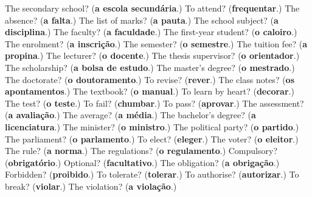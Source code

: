 \begin{tcolorbox}[breakable,colback=teal!4,colframe=teal!35!black,title={Before you move on}]
The secondary school? (\textbf{a escola secundária}.) To attend? (\textbf{frequentar}.) The absence? (\textbf{a falta}.) The list of marks? (\textbf{a pauta}.) The school subject? (\textbf{a disciplina}.) The faculty? (\textbf{a faculdade}.) The first-year student? (\textbf{o caloiro}.) The enrolment? (\textbf{a inscrição}.) The semester? (\textbf{o semestre}.) The tuition fee? (\textbf{a propina}.) The lecturer? (\textbf{o docente}.) The thesis supervisor? (\textbf{o orientador}.) The scholarship? (\textbf{a bolsa de estudo}.) The master's degree? (\textbf{o mestrado}.) The doctorate? (\textbf{o doutoramento}.) To revise? (\textbf{rever}.) The class notes? (\textbf{os apontamentos}.) The textbook? (\textbf{o manual}.) To learn by heart? (\textbf{decorar}.) The test? (\textbf{o teste}.) To fail? (\textbf{chumbar}.) To pass? (\textbf{aprovar}.) The assessment? (\textbf{a avaliação}.) The average? (\textbf{a média}.) The bachelor's degree? (\textbf{a licenciatura}.) The minister? (\textbf{o ministro}.) The political party? (\textbf{o partido}.) The parliament? (\textbf{o parlamento}.) To elect? (\textbf{eleger}.) The voter? (\textbf{o eleitor}.) The rule? (\textbf{a norma}.) The regulations? (\textbf{o regulamento}.) Compulsory? (\textbf{obrigatório}.) Optional? (\textbf{facultativo}.) The obligation? (\textbf{a obrigação}.) Forbidden? (\textbf{proibido}.) To tolerate? (\textbf{tolerar}.) To authorise? (\textbf{autorizar}.) To break? (\textbf{violar}.) The violation? (\textbf{a violação}.)
\end{tcolorbox}
